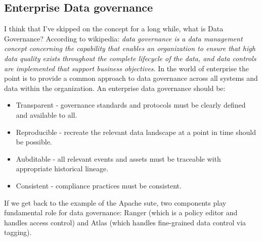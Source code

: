 \subsection{Enterprise Data governance}
I think that I've skipped on the concept for a long while, what is Data Governance?
According to wikipedia: \textit{data governance is a data management concept concerning the capability that enables an organization to ensure that high data quality exists throughout the complete lifecycle of the data, and data controls are implemented that support business objectives}. \n
In the world of enterprise the point is to provide a common approach to data governance across all systems and data within the organization. An enterprise data governance should be:
\begin{itemize}
    \item Transparent - governance standards and protocols must be clearly defined and available to all.
    \item Reproducible - recreate the relevant data landscape at a point in time should be possible.
    \item Aubditable - all relevant events and assets must be traceable with appropriate historical lineage.
    \item Consistent - compliance practices must be consistent.
\end{itemize}
If we get back to the example of the Apache sute, two components play fundamental role for data governance:
Ranger (which is a policy editor and handles access control) and Atlas (which handles fine-grained data control via tagging). \n
